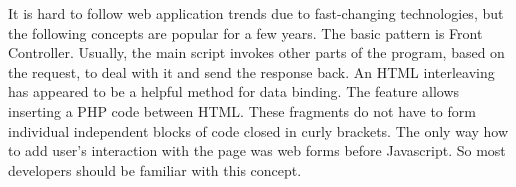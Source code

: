 It is hard to follow web application trends due to fast-changing technologies, but the following concepts are popular for a few years.
The basic pattern is Front Controller.
Usually, the main script invokes other parts of the program, based on the request, to deal with it and send the response back.
An HTML interleaving has appeared to be a helpful method for data binding.
The feature allows inserting a PHP code between HTML.
These fragments do not have to form individual independent blocks of code closed in curly brackets.
The only way how to add user's interaction with the page was web forms before Javascript.
So most developers should be familiar with this concept.
